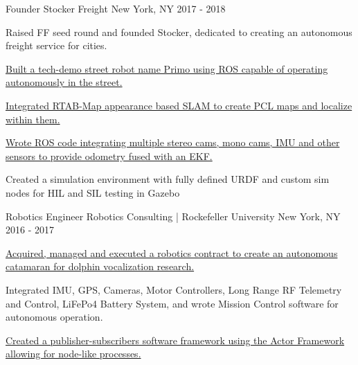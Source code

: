 

\begin{cventries}

  \cventry
    {Founder} %
    {Stocker Freight} %
    {New York, NY} %
    {2017 - 2018} %
    {
      \begin{cvitems} %
        \item {Raised FF seed round and founded Stocker, dedicated to creating an autonomous freight service for cities.}
        \item {\href{http://bit.ly/2T3Kvvs}
            {Built a tech-demo street robot name Primo using ROS capable of operating autonomously in the street.}}
        \item {\href{http://bit.ly/2TjikYy}
            {Integrated RTAB-Map appearance based SLAM to create PCL maps and localize within them.}}
        \item {\href{http://bit.ly/2T3d4sU}
            {Wrote ROS code integrating multiple stereo cams, mono cams, IMU and other sensors to provide odometry fused with an EKF.}}
        \item {Created a simulation environment with fully defined URDF and custom sim nodes for HIL and SIL testing in Gazebo}
      \end{cvitems}
    }

  \cventry
    {Robotics Engineer} %
    {Robotics Consulting | Rockefeller University} %
    {New York, NY} %
    {2016 - 2017} %
    {
      \begin{cvitems} %
        \item {\href{http://bit.ly/2Tg8zKO}
            {Acquired, managed and executed a robotics contract to create an autonomous catamaran for dolphin vocalization research.}}
        \item {Integrated IMU, GPS, Cameras, Motor Controllers, Long Range RF Telemetry and Control, 
                    LiFePo4 Battery System, and wrote Mission Control software for autonomous operation.}
        \item {\href{http://bit.ly/2BSBD1c}{Created a publisher-subscribers software framework using the Actor Framework allowing for node-like processes.}}
      \end{cvitems}
    }


\end{cventries}
